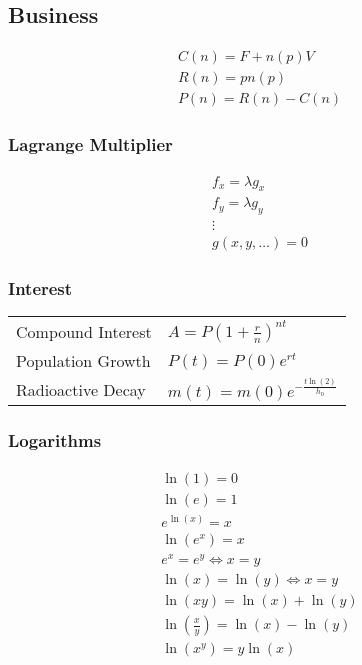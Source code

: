 \documentclass[letterpaper,12pt,fleqn]{article}
\renewcommand{\l}{\lambda}
\begin{document}
\subsection*{Business}

\begin{gather*}
  C(n)=F+n(p)V \\
  R(n)=pn(p) \\
  P(n)=R(n)-C(n)
\end{gather*}

\subsubsection*{Lagrange Multiplier}

\begin{gather*}
f_x=\l g_x \\
f_y=\l g_y \\
\vdots \\
g(x,y,\ldots)=0
\end{gather*}

\subsubsection*{Interest}

\begin{tabular}{ll}
  Compound Interest & \(A=P\left(1+\frac{r}{n}\right)^{nt}\) \\
  Population Growth & \(P(t)=P(0)e^{rt}\) \\
  Radioactive Decay & \(m(t)=m(0)e^{-\frac{t\ln(2)}{h_0}}\)
\end{tabular}

\subsubsection*{Logarithms}

\begin{gather*}
  \ln(1)=0 \\
  \ln(e)=1 \\
  e^{\ln(x)}=x \\
  \ln(e^x)=x \\
  e^x=e^y\iff x=y \\
  \ln(x)=\ln(y)\iff x=y \\
  \ln(xy)=\ln(x)+\ln(y) \\
  \ln\left(\frac{x}{y}\right)=\ln(x)-\ln(y) \\
  \ln\left(x^y\right)=y\ln(x)
\end{gather*}
\end{document}
